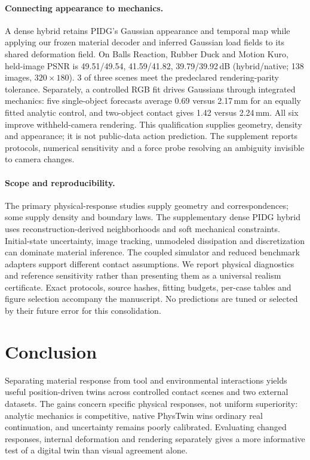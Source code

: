 \documentclass[10pt,twocolumn,letterpaper]{article}
\begin{document}
\paragraph{Connecting appearance to mechanics.}
A dense hybrid retains PIDG's Gaussian appearance and temporal map while applying our frozen material decoder and inferred Gaussian load fields to its shared deformation field. On Balls Reaction, Rubber Duck and Motion Kuro, held-image PSNR is 49.51/49.54, 41.59/41.82, 39.79/39.92\,dB (hybrid/native; 138 images, $320\times180$). 3 of three scenes meet the predeclared rendering-parity tolerance. Separately, a controlled RGB fit drives Gaussians through integrated mechanics: five single-object forecasts average 0.69 versus 2.17\,mm for an equally fitted analytic control, and two-object contact gives 1.42 versus 2.24\,mm. All six improve withheld-camera rendering. This qualification supplies geometry, density and appearance; it is not public-data action prediction. The supplement reports protocols, numerical sensitivity and a force probe resolving an ambiguity invisible to camera changes.

\paragraph{Scope and reproducibility.}
The primary physical-response studies supply geometry and correspondences; some supply density and boundary laws. The supplementary dense PIDG hybrid uses reconstruction-derived neighborhoods and soft mechanical constraints. Initial-state uncertainty, image tracking, unmodeled dissipation and discretization can dominate material inference. The coupled simulator and reduced benchmark adapters support different contact assumptions. We report physical diagnostics and reference sensitivity rather than presenting them as a universal realism certificate. Exact protocols, source hashes, fitting budgets, per-case tables and figure selection accompany the manuscript. No predictions are tuned or selected by their future error for this consolidation.

\section{Conclusion}
Separating material response from tool and environmental interactions yields useful position-driven twins across controlled contact scenes and two external datasets. The gains concern specific physical responses, not uniform superiority: analytic mechanics is competitive, native PhysTwin wins ordinary real continuation, and uncertainty remains poorly calibrated. Evaluating changed responses, internal deformation and rendering separately gives a more informative test of a digital twin than visual agreement alone.
\clearpage
\end{document}
